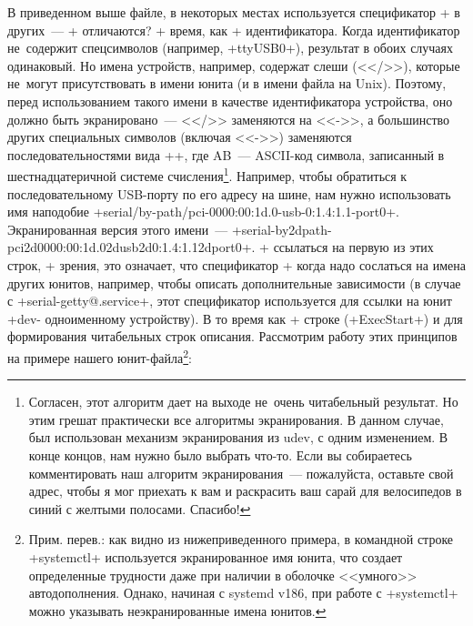 \documentclass[10pt,oneside,a4paper]{article}
\begin{document}
В приведенном выше файле, в некоторых местах используется спецификатор +%
в других~--- +%
отличаются? +%
время, как +%
идентификатора. Когда идентификатор не~содержит спецсимволов (например,
+ttyUSB0+), результат в обоих случаях одинаковый. Но имена устройств, например,
содержат слеши (<</>>), которые не~могут присутствовать в имени юнита (и в имени
файла на Unix). Поэтому, перед использованием такого имени в качестве
идентификатора устройства, оно должно быть экранировано~--- <</>> заменяются на
<<->>, а большинство других специальных символов (включая <<->>) заменяются
последовательностями вида +\xAB+, где AB~--- ASCII-код символа, записанный в
шестнадцатеричной системе счисления\footnote{Согласен, этот алгоритм дает на
выходе не~очень читабельный результат. Но этим грешат практически все алгоритмы
экранирования. В данном случае, был использован механизм экранирования из udev,
с одним изменением. В конце концов, нам нужно было выбрать что-то. Если вы
собираетесь комментировать наш алгоритм экранирования~--- пожалуйста, оставьте
свой адрес, чтобы я мог приехать к вам и раскрасить ваш сарай для велосипедов в
синий с желтыми полосами. Спасибо!}. Например, чтобы обратиться к
последовательному USB-порту по его адресу на шине, нам нужно использовать имя
наподобие +serial/by-path/pci-0000:00:1d.0-usb-0:1.4:1.1-port0+. Экранированная
версия этого имени~---
+serial-by\x2dpath-pci\x2d0000:00:1d.0\x2dusb\x2d0:1.4:1.1\x2dport0+. +%
ссылаться на первую из этих строк, +%
зрения, это означает, что спецификатор +%
когда надо сослаться на имена других юнитов, например, чтобы описать
дополнительные зависимости (в случае с +serial-getty@.service+, этот
спецификатор используется для ссылки на юнит +dev-%
одноименному устройству). В то время как +%
строке (+ExecStart+) и для формирования читабельных строк описания. Рассмотрим
работу этих принципов на примере нашего юнит-файла\footnote{Прим. перев.: как
видно из нижеприведенного примера, в командной строке +systemctl+ используется
экранированное имя юнита, что создает определенные трудности даже при
наличии в оболочке <<умного>> автодополнения. Однако, начиная с systemd v186,
при работе с +systemctl+ можно указывать неэкранированные имена юнитов.}:
\end{document}
